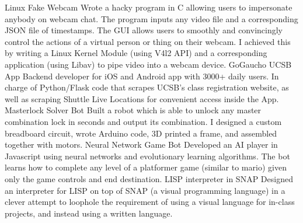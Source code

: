 


\begin{cvskills}

  \vspace{1mm}
  \cvskill 
    {Linux Fake Webcam} %
    {Wrote a hacky program in C allowing users to impersonate anybody on webcam chat. The program inputs any video file and a corresponding JSON file of timestamps. The GUI allows users to smoothly and convincingly control the actions of a virtual person or thing on their webcam. I achieved this by writing a Linux Kernel Module (using V4l2 API) and a corresponding application (using Libav) to pipe video into a webcam device.} %
  \vspace{1mm}
  \cvskill
    {GoGaucho UCSB App} %
    {Backend developer for iOS and Android app with 3000+ daily users. In charge of Python/Flask code that scrapes UCSB's class registration website, as well as scraping Shuttle Live Locations for convenient access inside the App.} %
\cvskill
    {Masterlock Solver Bot} %
    {Built a robot which is able to unlock any master combination lock in seconds and output its combination. I designed a custom breadboard circuit, wrote Arduino code, 3D printed a frame, and assembled together with motors.} %
  \vspace{1mm}
\cvskill
  {Neural Network Game Bot}
  {Developed an AI player in Javascript using neural networks and evolutionary learning algorithms. The bot learns how to complete any level of a platformer game (similar to mario) given only the game controls and end destination.}
  \vspace{1mm}
  \cvskill
    {LISP interpreter in SNAP} %
    {Designed an interpreter for LISP on top of SNAP (a visual programming language) in a clever attempt to loophole the requirement of using a visual language for in-class projects, and instead using a written language.} %
  \vspace{1mm}

\end{cvskills}
